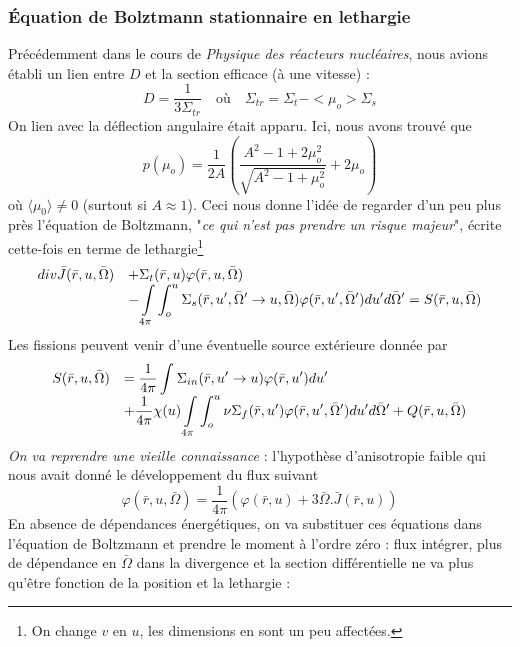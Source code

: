 	\subsubsection{Équation de Bolztmann stationnaire en lethargie}	
	Précédemment dans le cours de \textit{Physique des réacteurs nucléaires}, nous avions établi un
	lien entre $D$ et la section efficace (à une vitesse) :
	\begin{equation}
	D = \frac{1}{{3{\Sigma _{tr}}}}\quad\text{où}\quad {\Sigma _{tr}} = {\Sigma _t} -  < {\mu _o} >
	 {\Sigma _s}
	\end{equation}
	On lien avec la déflection angulaire était apparu. Ici, nous avons trouvé que
	\begin{equation}
	p({\mu _o}) = \frac{1}{{2A}}\left( \frac{{{A^2} - 1 + 2\mu _o^2}}{{\sqrt {{A^2} - 1 + \mu _o^2}
	 }} + 2{\mu _o}  \right)
	\end{equation}
	où $\langle\mu_0\rangle \neq 0$ (surtout si $A\approx 1$). Ceci nous donne l'idée de regarder 
	d'un peu plus près l'équation de Boltzmann, "\textit{ce qui n'est pas prendre un risque majeur}",
	écrite cette-fois en terme de lethargie\footnote{On change $v$ en $u$, les dimensions en sont un 
	peu affectées.}
	\begin{equation}
	\begin{array}{ll}
	div\bar J(\bar r,u,\bar \Omega )& \displaystyle + {\Sigma _t}(\bar r,u)\varphi (\bar r,u,\bar \Omega )\\
	 &\displaystyle - \int\limits_{4\pi }    \int_o^u    {\Sigma _s}(\bar r,u',\bar \Omega ' \to
	u,	\bar \Omega )\varphi (\bar r,u',\bar \Omega ')du'd\bar \Omega ' = S(\bar r,u,\bar \Omega )
	\end{array}	\end{equation}	
	Les fissions peuvent venir d'une éventuelle source extérieure donnée par
	\begin{equation}
	\begin{array}{ll}
	S(\bar r,u,\bar \Omega )&\displaystyle = \frac{1}{{4\pi }}\int_{}^{}    {\Sigma _{in}}(\bar r,u' \to u)
	\varphi (\bar r,u')du'\\
	&\displaystyle+ \frac{1}{{4\pi }}\chi (u)\int\limits_{4\pi }   \int_o^u   \nu {\Sigma _f}(\bar r,u')\varphi
	(\bar r,u',\bar \Omega ')du'd\bar \Omega ' + Q(\bar r,u,\bar \Omega )
	\end{array}
	\end{equation}		
	\textit{On va reprendre une vieille connaissance} : l'hypothèse d'anisotropie faible qui nous 
	avait donné le développement du flux suivant
	\begin{equation}
	\varphi (\bar r,u,\bar \Omega ) = \frac{1}{{4\pi }}(\varphi (\bar r,u) + 3\bar \Omega .\bar 
	J(\bar r,u))
	\end{equation}
	En absence de dépendances énergétiques, on va substituer ces équations dans l'équation de 
	Boltzmann et prendre le moment à l'ordre zéro : flux intégrer, plus de dépendance en 
	$\bar{\Omega}$ dans la divergence et la section différentielle ne va plus qu'être fonction 
	de la position et la lethargie :\\
	
